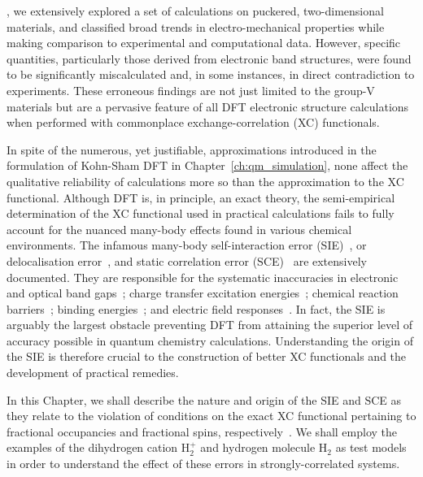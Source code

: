 
, 
we extensively explored 
a set of calculations on 
puckered, two-dimensional materials, 
and classified broad trends in 
electro-mechanical properties 
while making comparison 
to experimental and computational data.
%
However, specific quantities, 
particularly those derived 
from electronic band structures, 
were found to be 
significantly miscalculated and, 
in some instances, 
in direct contradiction to experiments.
%
These erroneous findings are not just limited 
to the group-V materials but 
are a {pervasive} feature of all DFT 
electronic structure calculations 
when performed with {commonplace}  
exchange-correlation (XC) functionals.

In spite of the numerous, 
yet justifiable, approximations 
introduced in the formulation of Kohn-Sham DFT 
in Chapter~\ref{ch:qm_simulation}, 
none affect the qualitative reliability of calculations 
more so than the approximation to the XC functional.
%
Although DFT is, 
in principle, an exact theory, 
the semi-empirical determination 
of the XC functional used in practical calculations 
fails to fully account for 
the nuanced many-body effects 
found in various chemical environments.
%
The infamous 
many-body self-interaction error (SIE)~\cite{PhysRevB.23.5048,doi:10.1063/1.476859,doi:10.1063/1.463297,seminario1996recent,PhysRevB.56.16021}, 
or delocalisation error~\cite{cohen2008insights,doi:10.1021/cr200107z,PhysRevLett.100.146401}, 
and static correlation error (SCE)~\cite{seminario1996recent,PhysRevLett.87.133004,doi:10.1063/1.1589733,cohen2008insights,doi:10.1063/1.2987202,doi:10.1021/cr200107z,PhysRevB.77.115123,doi:10.1021/ct8005419,PhysRevA.88.030501,PhysRevA.85.042507}
are extensively documented.
%
They are responsible for the systematic inaccuracies in 
electronic and optical band gaps~\cite{QUA:QUA560280846}; 
charge transfer excitation energies~\cite{doi:10.1021/jp9533077}; 
chemical reaction barriers~\cite{JOHNSON1994100,JURSIC1996603,BAKER199553};
binding energies~\cite{doi:10.1063/1.463297,doi:10.1021/jp972378y};
and electric field responses~\cite{:/content/aip/journal/jcp/119/21/10.1063/1.1630011}.
%
In fact, the SIE is arguably the largest obstacle  
{preventing DFT from attaining 
the superior level of accuracy 
possible in quantum chemistry calculations}. 
%
Understanding the origin of the SIE 
is therefore crucial to the 
construction of better XC functionals 
and the development of practical remedies.

%
In this Chapter, 
we shall describe the nature 
and origin of the SIE and SCE 
as they relate to the violation of conditions 
on the exact XC functional 
pertaining to fractional occupancies 
and fractional spins, respectively~\cite{cohen2008insights}. 
%
We shall employ the examples of the 
dihydrogen cation H$_2^+$ 
and hydrogen molecule H$_2$ 
as test models
in order to {understand}  
the effect of these errors 
in strongly-correlated systems. 

